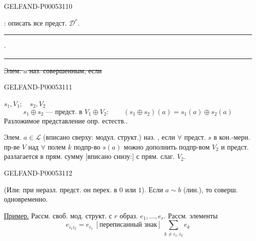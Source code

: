 \begin{GelfandAdjacentEvidence}{GELFAND-P000531}{10}


: описать все предст. $\mathcal D^r$.

\hfill\rule{1.1cm}{.35pt}\enspace\(\cdot\)\enspace\rule{1.3cm}{.35pt}\par

\sout{Элем. \mbox{$a$} наз. совершенным, если}
\end{GelfandAdjacentEvidence}
\begin{GelfandAdjacentEvidence}{GELFAND-P000531}{11}


$s_1,V_1;\quad s_2,V_2$
\[
s_1\oplus s_2\text{ — предст. в }V_1\oplus V_2:\qquad
(s_1\oplus s_2)(a)=s_1(a)\oplus s_2(a)
\]
Разложимое представление опр. естеств..

Элем. $a\in\mathcal L$ (вписано сверху: модул. структ.) наз. , если $\forall$ предст.
$s$ в кон.-мерн. пр-ве $V$ над $\forall$ полем $k$ подпр-во $s(a)$
можно дополнить подпр-вом $V_2$ и предст. разлагается в прям. сумму [вписано снизу:] с прям. слаг. $V_2$.
\end{GelfandAdjacentEvidence}
\begin{GelfandAdjacentEvidence}{GELFAND-P000531}{12}


(Или: при неразл. предст. он перех. в $0$ или $1$).
Если $a\sim b$ (лин.), то соверш. одновременно.

\uline{Пример.} Рассм. своб. мод. структ. с $r$ образ. $e_1,\ldots,e_r$. Рассм. элементы
\[
e_{i_1i_2}=e_{i_1}\ [\text{переписанный знак}]\ \sum_{k\ne i_1,i_2}e_k
\]
\end{GelfandAdjacentEvidence}



